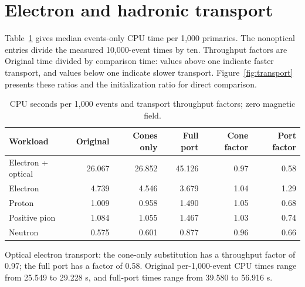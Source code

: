 \FloatBarrier

\section{Electron and hadronic transport}

Table~\ref{tab:3} gives median events-only CPU time per 1,000 primaries. The nonoptical entries divide the
measured 10,000-event times by ten. Throughput factors are Original time divided by comparison time: values
above one indicate faster transport, and values below one indicate slower transport. Figure~\ref{fig:transport}
presents these ratios and the initialization ratio for direct comparison.

\begin{table}[htbp]

\caption{CPU seconds per 1,000 events and transport throughput factors; zero magnetic field.}

\label{tab:3}

\centering

\small

\setlength{\tabcolsep}{4pt}

\renewcommand{\arraystretch}{1.15}

\begin{tabularx}{\textwidth}{@{}Xrrrrr@{}}

\toprule

Workload & Original & Cones only & Full port & Cone factor & Port factor \\

\midrule

Electron + optical & 26.067 & 26.852 & 45.126 & 0.97 & 0.58 \\

Electron & 4.739 & 4.546 & 3.679 & 1.04 & 1.29 \\

Proton & 1.009 & 0.958 & 1.490 & 1.05 & 0.68 \\

Positive pion & 1.084 & 1.055 & 1.467 & 1.03 & 0.74 \\

Neutron & 0.575 & 0.601 & 0.877 & 0.96 & 0.66 \\

\bottomrule

\end{tabularx}

\end{table}

Optical electron transport: the cone-only substitution has a throughput factor of 0.97; the full port has a
factor of 0.58. Original per-1,000-event CPU times range from 25.549 to 29.228 s, and full-port times range
from 39.580 to 56.916 s.

